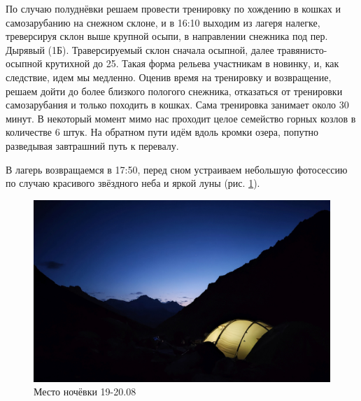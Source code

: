По случаю полуднёвки решаем провести тренировку по хождению в кошках и самозарубанию на снежном склоне, и в 16:10 выходим из лагеря налегке, треверсируя склон выше крупной осыпи, в направлении снежника под пер. Дырявый (1Б). Траверсируемый склон сначала осыпной, далее травянисто-осыпной крутихной до 25\degree. Такая форма рельева участникам в новинку, и, как следствие, идем мы медленно. Оценив время на тренировку и возвращение, решаем дойти до более близкого пологого снежника, отказаться от тренировки самозарубания и только походить в кошках. Сама тренировка занимает около 30 минут. В некоторый момент мимо нас проходит целое семейство горных козлов в количестве 6 штук.
На обратном пути идём вдоль кромки озера, попутно разведывая завтрашний путь к перевалу.

В лагерь возвращаемся в 17:50, перед сном устраиваем небольшую фотосессию по случаю красивого звёздного неба и яркой луны (рис. \ref{fig:IMG_20240829_194851}).

\begin{figure}[h!]
	\centering
	\includegraphics[width=0.7\linewidth]{../pics/IMG_20240829_194851}
	\caption{Место ночёвки 19-20.08}
	\label{fig:IMG_20240829_194851}
\end{figure}

\newpage